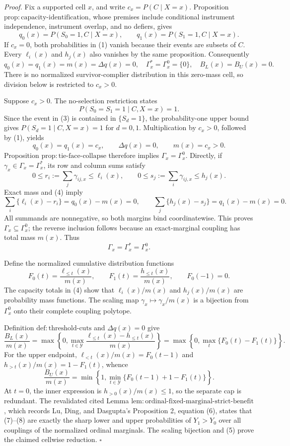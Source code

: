 \noindent\textit{Proof.}
Fix a supported cell \(x\), and write \(c_x=P(C\mid X=x)\).  Proposition
\(\mathrm{prop{:}capacity\text{-}identification}\), whose premises include
conditional instrument independence, instrument overlap, and no defiers,
gives
\[
q_0(x)=P(S_0=1,C\mid X=x),
\qquad
q_1(x)=P(S_1=1,C\mid X=x).
\tag{1}
\]
If \(c_x=0\), both probabilities in (1) vanish because their events are
subsets of \(C\).  Every \(\ell_i(x)\) and \(h_j(x)\) also vanishes by
the same proposition.  Consequently
\[
q_0(x)=q_1(x)=m(x)=\Delta q(x)=0,
\quad
\Gamma_x^{\ast}=\Gamma_x^{0}=\{0\},
\quad
B_L(x)=B_U(x)=0.
\tag{2}
\]
There is no normalized survivor-complier distribution in this zero-mass
cell, so division below is restricted to \(c_x>0\).

Suppose \(c_x>0\).  The no-selection restriction states
\[
P(S_0=S_1=1\mid C,X=x)=1.
\tag{3}
\]
Since the event in (3) is contained in \(\{S_d=1\}\), the probability-one
upper bound gives \(P(S_d=1\mid C,X=x)=1\) for \(d=0,1\).  Multiplication
by \(c_x>0\), followed by (1), yields
\[
q_0(x)=q_1(x)=c_x,
\qquad \Delta q(x)=0,
\qquad m(x)=c_x>0.
\tag{4}
\]
Proposition \(\mathrm{prop{:}tie\text{-}face\text{-}collapse}\) therefore
implies \(\Gamma_x=\Gamma_x^{0}\).  Directly, if
\(\gamma_x\in\Gamma_x=\Gamma_x^{\ast}\), its row and column sums satisfy
\[
0\le r_i:=\sum_j\gamma_{ij,x}\le\ell_i(x),
\qquad
0\le s_j:=\sum_i\gamma_{ij,x}\le h_j(x).
\]
Exact mass and (4) imply
\[
\sum_i\{\ell_i(x)-r_i\}=q_0(x)-m(x)=0,
\qquad
\sum_j\{h_j(x)-s_j\}=q_1(x)-m(x)=0.
\]
All summands are nonnegative, so both margins bind coordinatewise.  This
proves \(\Gamma_x\subseteq\Gamma_x^{0}\); the reverse inclusion follows
because an exact-marginal coupling has total mass \(m(x)\).  Thus
\[
\Gamma_x=\Gamma_x^{\ast}=\Gamma_x^{0}.
\tag{5}
\]

Define the normalized cumulative distribution functions
\[
F_0(t)=\frac{\ell_{\le t}(x)}{m(x)},
\qquad
F_1(t)=\frac{h_{\le t}(x)}{m(x)},
\qquad F_0(-1)=0.
\tag{6}
\]
The capacity totals in (4) show that \(\ell_i(x)/m(x)\) and
\(h_j(x)/m(x)\) are probability mass functions.  The scaling map
\(\gamma_x\mapsto\gamma_x/m(x)\) is a bijection from \(\Gamma_x^{0}\)
onto their complete coupling polytope.

Definition \(\mathrm{def{:}threshold\text{-}cuts}\) and \(\Delta q(x)=0\)
give
\[
\frac{B_L(x)}{m(x)}
=\max\left\{0,\max_{t\in\mathcal Y}
\frac{\ell_{\le t}(x)-h_{\le t}(x)}{m(x)}\right\}
=\max\left\{0,\max_t\{F_0(t)-F_1(t)\}\right\}.
\tag{7}
\]
For the upper endpoint,
\(\ell_{<t}(x)/m(x)=F_0(t-1)\) and
\(h_{>t}(x)/m(x)=1-F_1(t)\), whence
\[
\frac{B_U(x)}{m(x)}
=\min\left\{1,\min_{t\in\mathcal Y}
\{F_0(t-1)+1-F_1(t)\}\right\}.
\tag{8}
\]
At \(t=0\), the inner expression is \(h_{>0}(x)/m(x)\le1\), so the
separate cap is redundant.  The revalidated cited Lemma
\(\mathrm{lem{:}ordinal\text{-}fixed\text{-}marginal\text{-}strict\text{-}benefit}\),
which records Lu, Ding, and Dasgupta's Proposition 2, equation (6), states
that (7)--(8) are exactly the sharp lower and upper probabilities of
\(Y_1>Y_0\) over all couplings of the normalized ordinal marginals.  The
scaling bijection and (5) prove the claimed cellwise reduction. \(\square\)